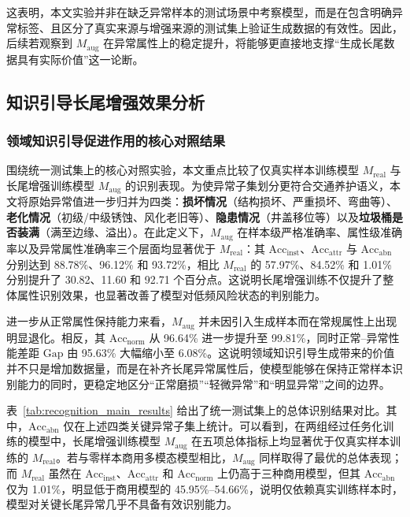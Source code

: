 这表明，本文实验并非在缺乏异常样本的测试场景中考察模型，而是在包含明确异常标签、且区分了真实来源与增强来源的测试集上验证生成数据的有效性。因此，后续若观察到 $M_{\mathrm{aug}}$ 在异常属性上的稳定提升，将能够更直接地支撑“生成长尾数据具有实际价值”这一论断。

\subsection{知识引导长尾增强效果分析}

\subsubsection{领域知识引导促进作用的核心对照结果}

围绕统一测试集上的核心对照实验，本文重点比较了仅真实样本训练模型 $M_{\mathrm{real}}$ 与长尾增强训练模型 $M_{\mathrm{aug}}$ 的识别表现。为使异常子集划分更符合交通养护语义，本文将原始异常值进一步归并为四类：\textbf{损坏情况}（结构损坏、严重损坏、弯曲等）、\textbf{老化情况}（初级/中级锈蚀、风化老旧等）、\textbf{隐患情况}（井盖移位等）以及\textbf{垃圾桶是否装满}（满至边缘、溢出）。在此定义下，$M_{\mathrm{aug}}$ 在样本级严格准确率、属性级准确率以及异常属性准确率三个层面均显著优于 $M_{\mathrm{real}}$：其 $\mathrm{Acc}_{\mathrm{inst}}$、$\mathrm{Acc}_{\mathrm{attr}}$ 与 $\mathrm{Acc}_{\mathrm{abn}}$ 分别达到 88.78\%、96.12\% 和 93.72\%，相比 $M_{\mathrm{real}}$ 的 57.97\%、84.52\% 和 1.01\% 分别提升了 30.82、11.60 和 92.71 个百分点。这说明长尾增强训练不仅提升了整体属性识别效果，也显著改善了模型对低频风险状态的判别能力。

进一步从正常属性保持能力来看，$M_{\mathrm{aug}}$ 并未因引入生成样本而在常规属性上出现明显退化。相反，其 $\mathrm{Acc}_{\mathrm{norm}}$ 从 96.64\% 进一步提升至 99.81\%，同时正常--异常性能差距 $\mathrm{Gap}$ 由 95.63\% 大幅缩小至 6.08\%。这说明领域知识引导生成带来的价值并不只是增加数据量，而是在补齐长尾异常属性后，使模型能够在保持正常样本识别能力的同时，更稳定地区分“正常磨损”“轻微异常”和“明显异常”之间的边界。

表~\ref{tab:recognition_main_results} 给出了统一测试集上的总体识别结果对比。其中，$\mathrm{Acc}_{\mathrm{abn}}$ 仅在上述四类关键异常子集上统计。可以看到，在两组经过任务化训练的模型中，长尾增强训练模型 $M_{\mathrm{aug}}$ 在五项总体指标上均显著优于仅真实样本训练的 $M_{\mathrm{real}}$。若与零样本商用多模态模型相比，$M_{\mathrm{aug}}$ 同样取得了最优的总体表现；而 $M_{\mathrm{real}}$ 虽然在 $\mathrm{Acc}_{\mathrm{inst}}$、$\mathrm{Acc}_{\mathrm{attr}}$ 和 $\mathrm{Acc}_{\mathrm{norm}}$ 上仍高于三种商用模型，但其 $\mathrm{Acc}_{\mathrm{abn}}$ 仅为 1.01\%，明显低于商用模型的 45.95\%--54.66\%，说明仅依赖真实训练样本时，模型对关键长尾异常几乎不具备有效识别能力。

